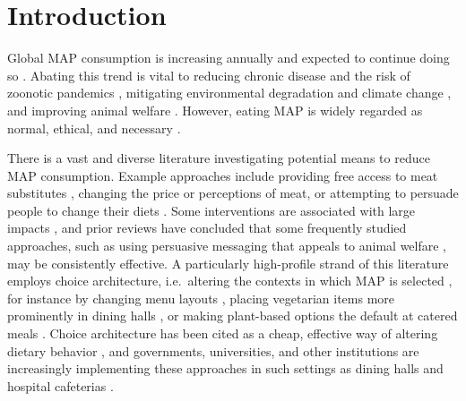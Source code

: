 \documentclass[sn-nature,referee,pdflatex]{sn-jnl}
\begin{document}



\maketitle

\section{Introduction}\label{sec1}

Global MAP consumption is increasing annually \citep{godfray2018} and
expected to continue doing so \citep{whitton2021}. Abating this trend is
vital to reducing chronic disease and the risk of zoonotic pandemics
\citep{willett2019, landry2023, hafez2020}, mitigating environmental
degradation and climate change
\citep{poore2018, koneswaran2008, greger2010}, and improving animal
welfare \citep{kuruc2023, scherer2019}. However, eating MAP is widely
regarded as normal, ethical, and necessary
\citep{piazza2022, milford2019}.

There is a vast and diverse literature investigating potential means to
reduce MAP consumption. Example approaches include providing free access
to meat substitutes \citep{katare2023}, changing the price
\citep{horgen2002} or perceptions \citep{kunst2016} of meat, or
attempting to persuade people to change their diets
\citep{bianchi2018conscious}. Some interventions are associated with
large impacts \citep{lentz2020, boronowsky2022, reinders2017}, and prior
reviews have concluded that some frequently studied approaches, such as
using persuasive messaging that appeals to animal welfare
\citep{mathur2021meta}, may be consistently effective. A particularly
high-profile strand of this literature employs choice architecture,
i.e.~altering the contexts in which MAP is selected
\citep{bianchi2018restructuring}, for instance by changing menu layouts
\citep{bacon2018, gravert2021}, placing vegetarian items more
prominently in dining halls \citep{ginn2024}, or making plant-based
options the default at catered meals \citep{hansen2021}. Choice
architecture has been cited as a cheap, effective way of altering
dietary behavior \citep{colgan2024}, and governments, universities, and
other institutions are increasingly implementing these approaches in
such settings as dining halls \citep{pollicino2024} and hospital
cafeterias \citep{morgenstern2024}.
\end{document}

